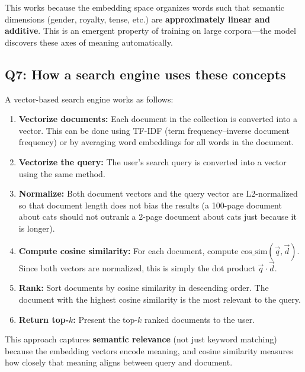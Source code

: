 \documentclass[11pt,a4paper]{article}
\begin{document}
This works because the embedding space organizes words such that semantic dimensions (gender, royalty, tense, etc.) are \textbf{approximately linear and additive}. This is an emergent property of training on large corpora---the model discovers these axes of meaning automatically.

\subsection*{Q7: How a search engine uses these concepts}

A vector-based search engine works as follows:

\begin{enumerate}[leftmargin=1.5em]
    \item \textbf{Vectorize documents:} Each document in the collection is converted into a vector. This can be done using TF-IDF (term frequency--inverse document frequency) or by averaging word embeddings for all words in the document.
    \item \textbf{Vectorize the query:} The user's search query is converted into a vector using the same method.
    \item \textbf{Normalize:} Both document vectors and the query vector are L2-normalized so that document length does not bias the results (a 100-page document about cats should not outrank a 2-page document about cats just because it is longer).
    \item \textbf{Compute cosine similarity:} For each document, compute $\text{cos\_sim}(\vec{q}, \vec{d})$. Since both vectors are normalized, this is simply the dot product $\vec{q} \cdot \vec{d}$.
    \item \textbf{Rank:} Sort documents by cosine similarity in descending order. The document with the highest cosine similarity is the most relevant to the query.
    \item \textbf{Return top-$k$:} Present the top-$k$ ranked documents to the user.
\end{enumerate}

This approach captures \textbf{semantic relevance} (not just keyword matching) because the embedding vectors encode meaning, and cosine similarity measures how closely that meaning aligns between query and document.
\end{document}
